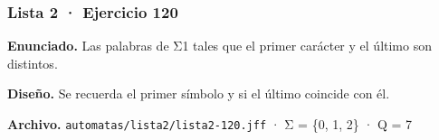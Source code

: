 
\hypertarget{lista-2-ejercicio-120}{%
\subsubsection{Lista 2 · Ejercicio 120}\label{lista-2-ejercicio-120}}

\textbf{Enunciado.} Las palabras de Σ1 tales que el primer carácter y el último son distintos.

\textbf{Diseño.} Se recuerda el primer símbolo y si el último coincide con él.

\textbf{Archivo.} \texttt{automatas/lista2/lista2-120.jff} · Σ = \{0, 1, 2\} · \textbar Q\textbar{} = 7

